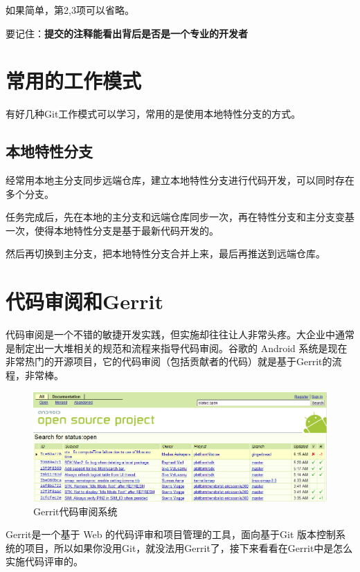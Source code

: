 如果简单，第2,3项可以省略。 

要记住：\textbf{提交的注释能看出背后是否是一个专业的开发者}

\section{常用的工作模式}
\label{常用的工作模式}

有好几种Git工作模式可以学习，常用的是使用本地特性分支的方式。

\subsection{本地特性分支}
\label{本地特性分支}

经常用本地主分支同步远端仓库，建立本地特性分支进行代码开发，可以同时存在多个分支。

任务完成后，先在本地的主分支和远端仓库同步一次，再在特性分支和主分支变基一次，使得本地特性分支是基于最新代码开发的。

然后再切换到主分支，把本地特性分支合并上来，最后再推送到远端仓库。

\section{代码审阅和Gerrit}
\label{代码审阅和gerrit}

代码审阅是一个不错的敏捷开发实践，但实施却往往让人非常头疼。大企业中通常是制定出一大堆相关的规范和流程来指导代码审阅。谷歌的 Android 系统是现在非常热门的开源项目，它的代码审阅（包括贡献者的代码）就是基于Gerrit的流程，非常棒。

\begin{figure}[htbp]
\centering
\includegraphics[keepaspectratio,width=\textwidth,height=0.75\textheight]{img/18333fig0202-tn.png}
\caption{Gerrit代码审阅系统}
\end{figure}

Gerrit是一个基于 Web 的代码评审和项目管理的工具，面向基于Git 版本控制系统的项目，所以如果你没用Git，就没法用Gerrit了，接下来看看在Gerrit中是怎么实施代码评审的。

